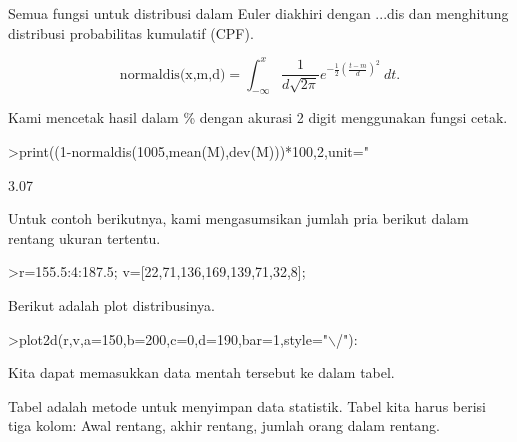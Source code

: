 \documentclass[a4paper,10pt]{article}
\begin{document}
\begin{eulernotebook}
\begin{eulercomment}
\begin{eulercomment}
\begin{eulercomment}
\begin{eulercomment}
\begin{eulercomment}
\begin{eulercomment}
\begin{eulercomment}
\begin{eulercomment}
\begin{eulercomment}
\begin{eulercomment}
\begin{eulercomment}
\begin{eulercomment}
\begin{eulercomment}
\begin{eulercomment}
\begin{eulercomment}
\begin{eulercomment}
\begin{eulercomment}
\begin{eulercomment}
\begin{eulercomment}
\begin{eulercomment}
\begin{eulercomment}
\begin{eulercomment}
\begin{eulercomment}
\begin{eulercomment}
\begin{eulercomment}
\begin{eulercomment}
\begin{eulercomment}
\begin{eulercomment}
\begin{eulercomment}
\begin{eulercomment}
\begin{eulercomment}
\begin{eulercomment}
\begin{eulercomment}
Semua fungsi untuk distribusi dalam Euler diakhiri dengan ...dis dan
menghitung distribusi probabilitas kumulatif (CPF).

\end{eulercomment}
\begin{eulerformula}
\[
\text{normaldis(x,m,d)}=\int_{-\infty}^x \frac{1}{d\sqrt{2\pi}}e^{-\frac{1}{2}(\frac{t-m}{d})^2}\ dt.
\]
\end{eulerformula}
\begin{eulercomment}
Kami mencetak hasil dalam \% dengan akurasi 2 digit menggunakan fungsi
cetak.
\end{eulercomment}
\begin{eulerprompt}
>print((1-normaldis(1005,mean(M),dev(M)))*100,2,unit=" %
\end{eulerprompt}
\begin{euleroutput}
        3.07 %
\end{euleroutput}
\begin{eulercomment}
Untuk contoh berikutnya, kami mengasumsikan jumlah pria berikut dalam
rentang ukuran tertentu.
\end{eulercomment}
\begin{eulerprompt}
>r=155.5:4:187.5; v=[22,71,136,169,139,71,32,8];
\end{eulerprompt}
\begin{eulercomment}
Berikut adalah plot distribusinya.
\end{eulercomment}
\begin{eulerprompt}
>plot2d(r,v,a=150,b=200,c=0,d=190,bar=1,style="\(\backslash\)/"):
\end{eulerprompt}
\begin{eulercomment}
Kita dapat memasukkan data mentah tersebut ke dalam tabel.

Tabel adalah metode untuk menyimpan data statistik. Tabel kita harus
berisi tiga kolom: Awal rentang, akhir rentang, jumlah orang dalam
rentang.


\end{eulercomment}
\end{eulercomment}
\end{eulercomment}
\end{eulercomment}
\end{eulercomment}
\end{eulercomment}
\end{eulercomment}
\end{eulercomment}
\end{eulercomment}
\end{eulercomment}
\end{eulercomment}
\end{eulercomment}
\end{eulercomment}
\end{eulercomment}
\end{eulercomment}
\end{eulercomment}
\end{eulercomment}
\end{eulercomment}
\end{eulercomment}
\end{eulercomment}
\end{eulercomment}
\end{eulercomment}
\end{eulercomment}
\end{eulercomment}
\end{eulercomment}
\end{eulercomment}
\end{eulercomment}
\end{eulercomment}
\end{eulercomment}
\end{eulercomment}
\end{eulercomment}
\end{eulercomment}
\end{eulercomment}
\end{eulernotebook}
\end{document}

